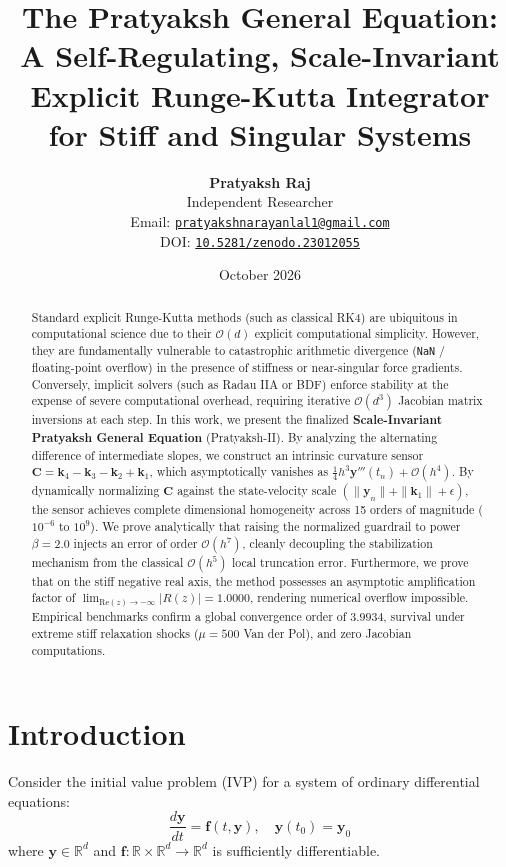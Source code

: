 \documentclass[11pt,a4paper]{article}
\title{\textbf{The Pratyaksh General Equation: A Self-Regulating, Scale-Invariant Explicit Runge-Kutta Integrator for Stiff and Singular Systems}}
\author{\textbf{Pratyaksh Raj} \\
\small Independent Researcher \\
\small Email: \href{mailto:pratyakshnarayanlal1@gmail.com}{\texttt{pratyakshnarayanlal1@gmail.com}} \\
\small DOI: \href{https://doi.org/10.5281/zenodo.23012055}{\texttt{10.5281/zenodo.23012055}}
}
\date{October 2026}
\theoremstyle{plain}
\theoremstyle{definition}
\begin{document}
\maketitle

\begin{abstract}
Standard explicit Runge-Kutta methods (such as classical RK4) are ubiquitous in computational science due to their $\mathcal{O}(d)$ explicit computational simplicity. However, they are fundamentally vulnerable to catastrophic arithmetic divergence (\texttt{NaN} / floating-point overflow) in the presence of stiffness or near-singular force gradients. Conversely, implicit solvers (such as Radau IIA or BDF) enforce stability at the expense of severe computational overhead, requiring iterative $\mathcal{O}(d^3)$ Jacobian matrix inversions at each step. In this work, we present the finalized \textbf{Scale-Invariant Pratyaksh General Equation} (Pratyaksh-II). By analyzing the alternating difference of intermediate slopes, we construct an intrinsic curvature sensor $\mathbf{C} = \mathbf{k}_4 - \mathbf{k}_3 - \mathbf{k}_2 + \mathbf{k}_1$, which asymptotically vanishes as $\frac{1}{4} h^3 \mathbf{y}'''(t_n) + \mathcal{O}(h^4)$. By dynamically normalizing $\mathbf{C}$ against the state-velocity scale $(\|\mathbf{y}_n\| + \|\mathbf{k}_1\| + \epsilon)$, the sensor achieves complete dimensional homogeneity across 15 orders of magnitude ($10^{-6}$ to $10^{9}$). We prove analytically that raising the normalized guardrail to power $\beta = 2.0$ injects an error of order $\mathcal{O}(h^7)$, cleanly decoupling the stabilization mechanism from the classical $\mathcal{O}(h^5)$ local truncation error. Furthermore, we prove that on the stiff negative real axis, the method possesses an asymptotic amplification factor of $\lim_{\text{Re}(z) \to -\infty} |R(z)| = 1.0000$, rendering numerical overflow impossible. Empirical benchmarks confirm a global convergence order of $3.9934$, survival under extreme stiff relaxation shocks ($\mu = 500$ Van der Pol), and zero Jacobian computations.
\end{abstract}

\section{Introduction}
Consider the initial value problem (IVP) for a system of ordinary differential equations:
\begin{equation}
\frac{d\mathbf{y}}{dt} = \mathbf{f}(t, \mathbf{y}), \quad \mathbf{y}(t_0) = \mathbf{y}_0
\end{equation}
where $\mathbf{y} \in \mathbb{R}^d$ and $\mathbf{f}: \mathbb{R} \times \mathbb{R}^d \to \mathbb{R}^d$ is sufficiently differentiable.
\end{document}
